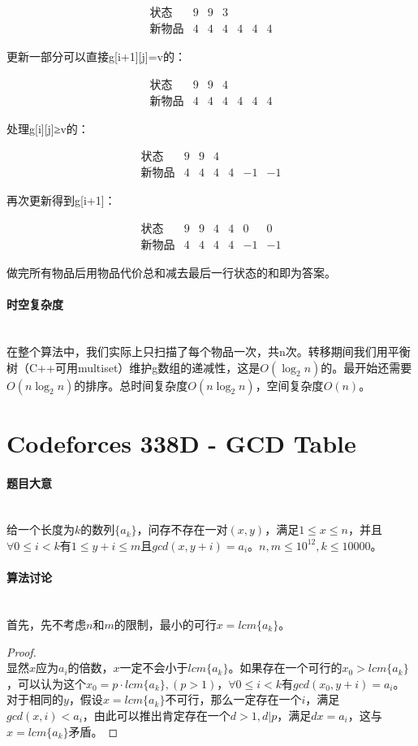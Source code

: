 \documentclass[UTF8]{ctexart}
\newcommand{\myparagraph}[1]{\paragraph{#1}\mbox{}\\}
\theoremstyle{nonumberplain}
\newtheorem{proof}{\hspace{1em}证明：}
\begin{document}
			$$\begin{array}{lcccccc}
				\mbox{状态} & 9 & 9 & 3 &  &  &  \\
				\mbox{新物品} & 4 & 4 & 4 & 4 & 4 & 4
			\end{array}$$
			
			更新一部分可以直接g[i+1][j]=v的：
			
			$$\begin{array}{lcccccc}
				\mbox{状态} & 9 & 9 & 4 &  &  &  \\
				\mbox{新物品} & 4 & 4 & 4 & 4 & 4 & 4
			\end{array}$$
			
			处理g[i][j]≥v的：
			
			$$\begin{array}{lcccccc}
				\mbox{状态} & 9 & 9 & 4 &  &  &  \\
				\mbox{新物品} & 4 & 4 & 4 & 4 & -1 & -1
			\end{array}$$
			
			再次更新得到g[i+1]：
			
			$$\begin{array}{lcccccc}
				\mbox{状态} & 9 & 9 & 4 & 4 & 0 & 0 \\
				\mbox{新物品} & 4 & 4 & 4 & 4 & -1 & -1
			\end{array}$$
			
			做完所有物品后用物品代价总和减去最后一行状态的和即为答案。
		
		\myparagraph{时空复杂度}
		
			在整个算法中，我们实际上只扫描了每个物品一次，共n次。转移期间我们用平衡树（C++可用multiset）维护g数组的递减性，这是$O(\log_2n)$的。最开始还需要$O(n\log_2n)$的排序。总时间复杂度$O(n\log_2n)$，空间复杂度$O(n)$。
	
	\section{Codeforces 338D - GCD Table}
	
		\myparagraph{题目大意}
		
			给一个长度为$k$的数列$\{a_k\}$，问存不存在一对$(x,y)$，满足$1 \leq x \leq n$，并且$\forall 0 \leq i < k$有$1 \leq y+i \leq m$且$gcd(x,y+i)=a_i$。$n,m \leq 10^{12}, k \leq 10000$。
	
		\myparagraph{算法讨论}
		
			首先，先不考虑$n$和$m$的限制，最小的可行$x=lcm\{a_k\}$。
			
			\begin{proof}\mbox{}\\
			
				显然$x$应为$a_i$的倍数，$x$一定不会小于$lcm\{a_k\}$。如果存在一个可行的$x_0>lcm\{a_k\}$，可以认为这个$x_0=p \cdot lcm\{a_k\}, (p>1)$，$\forall 0 \leq i < k$有$gcd(x_0,y+i)=a_i$。对于相同的$y$，假设$x=lcm\{a_k\}$不可行，那么一定存在一个$i$，满足$gcd(x,i)<a_i$，由此可以推出肯定存在一个$d>1, d|p$，满足$dx=a_i$，这与$x=lcm\{a_k\}$矛盾。
			
			\end{proof}
			
\end{document}
